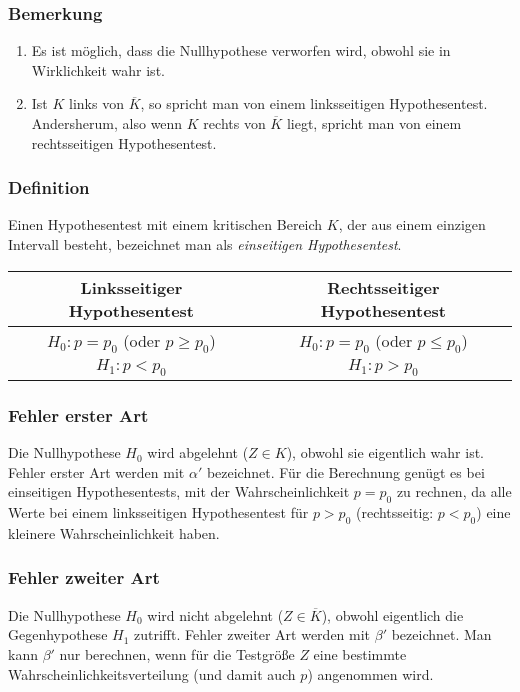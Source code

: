 \documentclass[a4paper,12pt]{article}
\begin{document}
\subsubsection{Bemerkung}
\begin{enumerate}[(1)]
\item Es ist möglich, dass die Nullhypothese verworfen wird, obwohl sie in Wirklichkeit wahr ist.
\item Ist $K$ links von $\overline{K}$, so spricht man von einem linksseitigen Hypothesentest. Andersherum, also wenn $K$ rechts von $\overline{K}$ liegt, spricht man von einem rechtsseitigen Hypothesentest.
\end{enumerate}

\subsubsection{Definition}
Einen Hypothesentest mit einem kritischen Bereich $K$, der aus einem einzigen Intervall besteht, bezeichnet man als \emph{einseitigen Hypothesentest}.
\par
\begin{center}

\begin{tabular}{ |c|c| }
\hline
Linksseitiger Hypothesentest & Rechtsseitiger Hypothesentest \\
\hline
$H_0:p=p_0$ (oder $p\geq p_0$) & $H_0:p=p_0$ (oder $p\leq p_0$) \\
$H_1: p<p_0$ & $H_1: p>p_0$ \\
\hline
\end{tabular}
\end{center}
\subsubsection{Fehler erster Art}
Die Nullhypothese $H_0$ wird abgelehnt ($Z \in K$), obwohl sie eigentlich wahr ist. Fehler erster Art werden mit $\alpha'$ bezeichnet. Für die Berechnung genügt es bei einseitigen Hypothesentests, mit der Wahrscheinlichkeit $p=p_0$ zu rechnen, da alle Werte bei einem linksseitigen Hypothesentest für $p>p_0$ (rechtsseitig: $p<p_0$) eine kleinere Wahrscheinlichkeit haben.
\subsubsection{Fehler zweiter Art}
Die Nullhypothese $H_0$ wird nicht abgelehnt ($Z \in \overline{K}$), obwohl eigentlich die Gegenhypothese $H_1$ zutrifft. Fehler zweiter Art werden mit $\beta'$ bezeichnet. Man kann $\beta'$ nur berechnen, wenn für die Testgröße $Z$ eine bestimmte Wahrscheinlichkeitsverteilung (und damit auch $p$) angenommen wird. 
\end{document}
